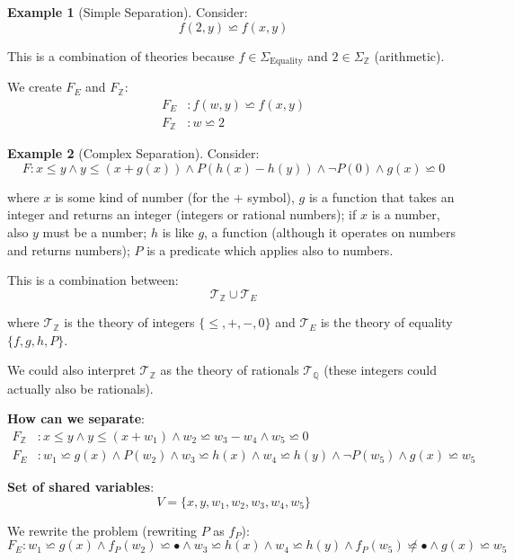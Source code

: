 \documentclass[11pt,a4paper]{article}
\theoremstyle{definition}
\newtheorem{example}{Example}[section]
\theoremstyle{plain}
\theoremstyle{remark}
\begin{document}
\begin{example}[Simple Separation]
Consider:
\[
f(2, y) \backsimeq f(x, y)
\]

This is a combination of theories because $f \in \Sigma_{\text{Equality}}$ and $2 \in \Sigma_{\mathbb{Z}}$ (arithmetic).

We create $F_E$ and $F_{\mathbb{Z}}$:
\begin{align*}
F_E &: f(w, y) \backsimeq f(x, y) \\
F_{\mathbb{Z}} &: w \backsimeq 2
\end{align*}
\end{example} 

\begin{example}[Complex Separation]
Consider:
\[
F: x \leq y \wedge y \leq (x + g(x)) \wedge P(h(x) - h(y)) \wedge \neg P(0) \wedge g(x) \backsimeq 0
\]

where $x$ is some kind of number (for the $+$ symbol), $g$ is a function that takes an integer and returns an integer (integers or rational numbers); if $x$ is a number, also $y$ must be a number; $h$ is like $g$, a function (although it operates on numbers and returns numbers); $P$ is a predicate which applies also to numbers.

This is a combination between:
\[
\mathcal{T}_{\mathbb{Z}} \cup \mathcal{T}_E
\]

where $\mathcal{T}_{\mathbb{Z}}$ is the theory of integers $\{\leq, +, -, 0\}$ and $\mathcal{T}_E$ is the theory of equality $\{f, g, h, P\}$.

We could also interpret $\mathcal{T}_{\mathbb{Z}}$ as the theory of rationals $\mathcal{T}_{\mathbb{Q}}$ (these integers could actually also be rationals).

\textbf{How can we separate}:
\begin{align*}
F_{\mathbb{Z}} &: x \leq y \wedge y \leq (x + w_1) \wedge w_2 \backsimeq w_3 - w_4 \wedge w_5 \backsimeq 0 \\
F_E &: w_1 \backsimeq g(x) \wedge P(w_2) \wedge w_3 \backsimeq h(x) \wedge w_4 \backsimeq h(y) \wedge \neg P(w_5) \wedge g(x) \backsimeq w_5
\end{align*}

\textbf{Set of shared variables}:
\[
V = \{x, y, w_1, w_2, w_3, w_4, w_5\}
\]

We rewrite the problem (rewriting $P$ as $f_P$):
\[
F_E: w_1 \backsimeq g(x) \wedge f_P(w_2) \backsimeq \bullet \wedge w_3 \backsimeq h(x) \wedge w_4 \backsimeq h(y) \wedge f_P(w_5) \not\backsimeq \bullet \wedge g(x) \backsimeq w_5
\]
\end{example} 
\end{document}
